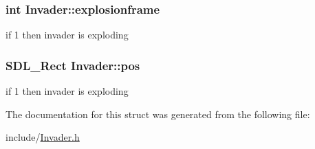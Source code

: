 \subsubsection[{explosionframe}]{\setlength{\rightskip}{0pt plus 5cm}int Invader\+::explosionframe}\label{structInvader_aa09d48ba0bdf587a6532711c226594c7}
if 1 then invader is exploding \hypertarget{structInvader_aa2028665eb1a567b754596ea72e76855}{}
\subsubsection[{pos}]{\setlength{\rightskip}{0pt plus 5cm}S\+D\+L\+\_\+\+Rect Invader\+::pos}\label{structInvader_aa2028665eb1a567b754596ea72e76855}
if 1 then invader is exploding 

The documentation for this struct was generated from the following file\+:\begin{DoxyCompactItemize}
\item 
include/\hyperlink{Invader_8h}{Invader.\+h}\end{DoxyCompactItemize}

